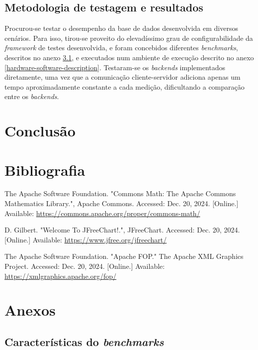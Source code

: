 \documentclass[11pt, a4paper]{article}
\begin{document}
\subsection{Metodologia de testagem e resultados}

Procurou-se testar o desempenho da base de dados desenvolvida em diversos cenários. Para isso,
tirou-se proveito do elevadíssimo grau de configurabilidade da \emph{framework} de testes
desenvolvida, e foram concebidos diferentes \emph{benchmarks}, descritos no anexo
\ref{benckmark-description}, e executados num ambiente de execução descrito no anexo
\ref{hardware-software-description}. Testaram-se os \emph{backends} implementados diretamente, uma
vez que a comunicação cliente-servidor adiciona apenas um tempo aproximadamente constante a cada
medição, dificultando a comparação entre os \emph{backends}.

\section{Conclusão}

\section{Bibliografia}
\def\refname{}
\vspace{-1.5cm}
\begin{thebibliography}{9}
        The Apache Software Foundation. "Commons Math: The Apache Commons Mathematics Library."{},
        Apache Commons. Accessed: Dec. 20, 2024. [Online.] Available:
        \url{https://commons.apache.org/proper/commons-math/}

        D. Gilbert. "Welcome To JFreeChart!."{}, JFreeChart. Accessed: Dec. 20, 2024. [Online.]
        Available: \url{https://www.jfree.org/jfreechart/}

        The Apache Software Foundation. "Apache FOP."{} The Apache XML Graphics Project. Accessed:
        Dec. 20, 2024. [Online.] Available: \url{https://xmlgraphics.apache.org/fop/}
\end{thebibliography}

\section{Anexos}

\subsection{Características do \emph{benchmarks}}
\label{benckmark-description}
\end{document}
